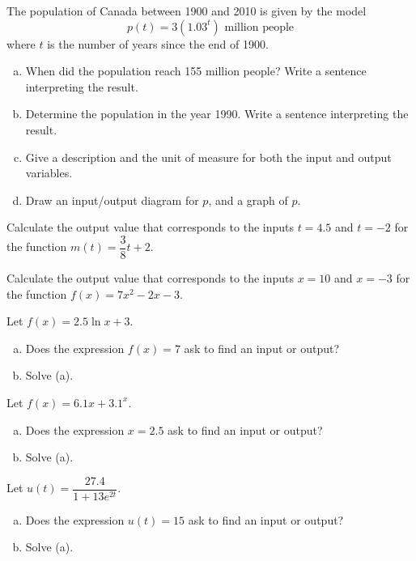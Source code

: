 \documentclass[notes]{subfiles}
\begin{document}
		
		\begin{ex}
			The population of Canada between 1900 and 2010 is given by the model
				\[p(t) = 3(1.03^t)\text{ million people}\]
			where $t$ is the number of years since the end of 1900.
			\begin{enumerate}[(a)]
				\item When did the population reach 155 million people?  Write a sentence interpreting the result.
				\item Determine the population in the year 1990.  Write a sentence interpreting the result.
				\item Give a description and the unit of measure for both the input and output variables.
				\item Draw an input/output diagram for $p$, and a graph of $p$.
			\end{enumerate}
		\end{ex}
			\newpage

		\begin{ex}
			Calculate the output value that corresponds to the inputs $t = 4.5$ and $t = -2$ for the function $m(t) = \dfrac{3}{8}t + 2$.
		\end{ex}
			\vs{1}

		\begin{ex}
			Calculate the output value that corresponds to the inputs $x = 10$ and $x = -3$ for the function $f(x) = 7x^2 -2x-3$.
		\end{ex}
			\vs{1}
		\begin{ex}
			Let $f(x) = 2.5\ln x + 3$.
			\begin{enumerate}[(a)]
				\item Does the expression $f(x) = 7$ ask to find an input or output?
					\vs{.5}
				\item Solve (a).
					\vs{1}
			\end{enumerate}
		\end{ex}
			\newpage

		\begin{ex}
			Let $f(x) = 6.1x + 3.1^x$.
			\begin{enumerate}[(a)]
				\item Does the expression $x = 2.5$ ask to find an input or output?
					\vs{.5}
				\item Solve (a).
					\vs{1}
			\end{enumerate}
		\end{ex}
			
		\begin{ex}
			Let $u(t) = \dfrac{27.4}{1+13e^{2t}}$.
			\begin{enumerate}[(a)]
				\item Does the expression $u(t) = 15$ ask to find an input or output?
					\vs{.5}
				\item Solve (a).
			\end{enumerate}
		\end{ex}
		
\end{document}

